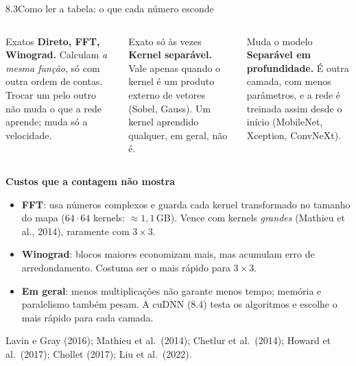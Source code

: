 \documentclass[aspectratio=169,11pt]{beamer}
\begin{document}
\begin{frame}{8.3\enspace Como ler a tabela: o que cada número esconde}
  \begin{columns}[T]
    \begin{block}{Exatos}
      \footnotesize
      \textbf{Direto, FFT, Winograd.} Calculam \emph{a mesma função}, só com outra ordem de contas. Trocar um pelo outro não muda o
      que a rede aprende; muda só a velocidade.
    \end{block}
    \begin{block}{Exato só às vezes}
      \footnotesize
      \textbf{Kernel separável.} Vale apenas quando o kernel é um produto externo de vetores (Sobel, Gauss). Um kernel aprendido
      qualquer, em geral, não é.
    \end{block}
    \begin{block}{Muda o modelo}
      \footnotesize
      \textbf{Separável em profundidade.} É outra camada, com menos parâmetros, e a rede é treinada assim desde o início
      (MobileNet, Xception, ConvNeXt).
    \end{block}
  \end{columns}
  \vspace{0.3em}
  \footnotesize
  \textbf{Custos que a contagem não mostra}
  \begin{itemize}
    \item \textbf{FFT}: usa números complexos e guarda cada kernel transformado no tamanho do mapa ($64\cdot64$ kernels: $\approx1{,}1$\,GB).
      Vence com kernels \emph{grandes} (Mathieu et al., 2014), raramente com $3\times3$.
    \item \textbf{Winograd}: blocos maiores economizam mais, mas acumulam erro de arredondamento. Costuma ser o mais rápido para $3\times3$.
    \item \textbf{Em geral}: menos multiplicações não garante menos tempo; memória e paralelismo também pesam. A cuDNN (8.4) testa os
      algoritmos e escolhe o mais rápido para cada camada.
  \end{itemize}
  {\scriptsize\textcolor{cinza}{Lavin e Gray (2016); Mathieu et al.\ (2014); Chetlur et al.\ (2014); Howard et al.\ (2017); Chollet (2017); Liu et al.\ (2022).}}
\end{frame}
\end{document}
